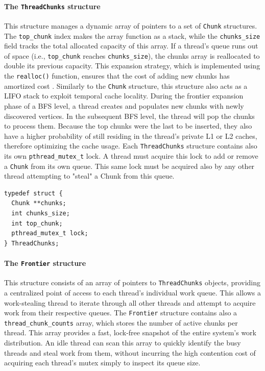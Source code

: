 \paragraph{The \texttt{ThreadChunks} structure} This structure manages a dynamic array of pointers to a set of \texttt{Chunk} structures. The \texttt{top\_chunk} index makes the array function as a stack, while the \texttt{chunks\_size} field tracks the total allocated capacity of this array. If a thread's queue runs out of space (i.e., \texttt{top\_chunk} reaches \texttt{chunks\_size}), the chunks array is reallocated to double its previous capacity. This expansion strategy, which is implemented using the \texttt{realloc()} function, ensures that the cost of adding new chunks has amortized cost . Similarly to the \texttt{Chunk} structure, this structure also acts as a LIFO stack to exploit temporal cache locality. During the frontier expansion phase of a BFS level, a thread creates and populates new chunks with newly discovered vertices. In the subsequent BFS level, the thread will pop the chunks to process them. Because the top chunks were the last to be inserted, they also have a higher probability of still residing in the thread's private L1 or L2 caches, therefore optimizing the cache usage. Each \texttt{ThreadChunks} structure contains also its own \texttt{pthread\_mutex\_t} lock. A thread must acquire this lock to add or remove a \texttt{Chunk} from its own queue. This same lock must be acquired also by any other thread attempting to "steal" a Chunk from this queue.

\begin{verbatim}
typedef struct {
  Chunk **chunks;
  int chunks_size;
  int top_chunk;
  pthread_mutex_t lock;
} ThreadChunks;
\end{verbatim}

\paragraph{The \texttt{Frontier} structure} This structure consists of an array of pointers to \texttt{ThreadChunks} objects, providing a centralized point of access to each thread's individual work queue. This allows a work-stealing thread to iterate through all other threads and attempt to acquire work from their respective queues. The \texttt{Frontier} structure contains also a \texttt{thread\_chunk\_counts} array, which stores the number of active chunks per thread. This array provides a fast, lock-free snapshot of the entire system's work distribution. An idle thread can scan this array to quickly identify the busy threads and steal work from them, without incurring the high contention cost of acquiring each thread's mutex simply to inspect its queue size.

